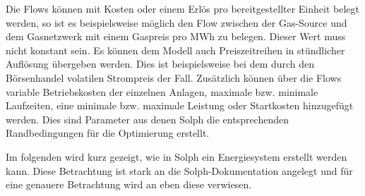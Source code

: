 Die Flows können mit Kosten oder einem Erlös pro bereitgestellter Einheit belegt werden, so ist es beispielsweise möglich den Flow zwischen der Gas-Source und dem Gasnetzwerk mit einem Gaspreis pro MWh zu belegen. Dieser Wert muss nicht konstant sein. Es können dem Modell auch Preiszeitreihen in stündlicher Auflösung übergeben werden. Dies ist beispielsweise bei dem durch den Börsenhandel volatilen Strompreis der Fall. Zusätzlich können über die Flows variable Betriebskosten der einzelnen Anlagen, maximale bzw. minimale Laufzeiten, eine minimale bzw. maximale Leistung oder Startkosten hinzugefügt werden. Dies sind Parameter aus denen Solph die entsprechenden Randbedingungen für die Optimierung erstellt.

Im folgenden wird kurz gezeigt, wie in Solph ein Energiesystem erstellt werden kann. Diese Betrachtung ist stark an die Solph-Dokumentation \cite{oemof2019} angelegt und für eine genauere Betrachtung wird an eben diese verwiesen. 

